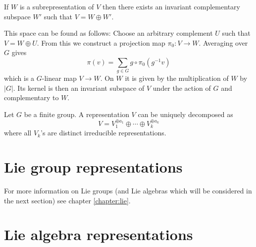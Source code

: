         \begin{property}
        	If $W$ is a subrepresentation of $V$ then there exists an invariant complementary subspace $W'$ such that $V = W \oplus W'$.
            
            This space can be found as follows: Choose an arbitrary complement $U$ such that $V = W \oplus U$. From this we construct a projection map $\pi_0:V \rightarrow W$. Averaging over $G$ gives
            \begin{equation}
            	\pi(v) = \sum_{g\in G}g\circ\pi_0(g^{-1}v)
            \end{equation}
            which is a $G$-linear map $V\rightarrow W$. On $W$ it is given by the multiplication of $W$ by $|G|$. Its kernel is then an invariant subspace of $V$ under the action of $G$ and complementary to $W$.
        \end{property}
        \begin{property}
        	Let $G$ be a finite group. A representation $V$ can be uniquely decomposed as
            \begin{equation}
            	V = V_1^{\oplus a_1}\oplus\cdots\oplus V_k^{\oplus a_k}
            \end{equation}
            where all $V_k$'s are distinct irreducible representations.
        \end{property}
        
\section{Lie group representations}

	For more information on Lie groups (and Lie algebras which will be considered in the next section) see chapter \ref{chapter:lie}.
	
	
\section{Lie algebra representations}

